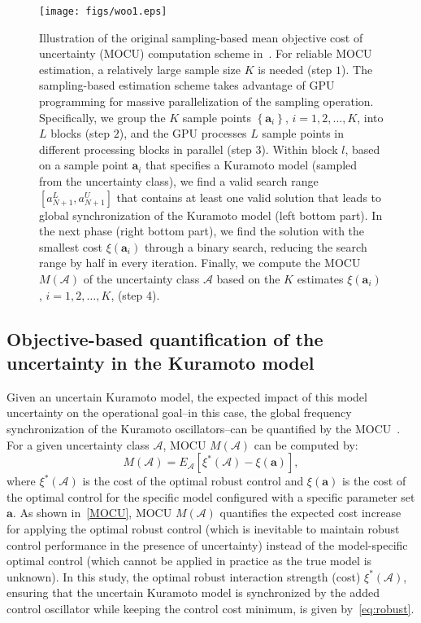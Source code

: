 \documentclass{article}
\begin{document}
\begin{figure*}[!t]
\centering
\texttt{[image: figs/woo1.eps]}
\caption{Illustration of the original sampling-based mean objective cost of uncertainty (MOCU) computation scheme in~\cite{Hong2021}. For reliable MOCU estimation, a relatively large sample size $K$ is needed (step $1$). The sampling-based estimation scheme takes advantage of GPU programming for massive parallelization of the sampling operation. Specifically, we group the $K$ sample points ${\left\{\mathbf{a}_i\right\}}$, ${i = 1, 2, \dots, K}$, into $L$ blocks (step $2$), and the GPU processes $L$ sample points in different processing blocks in parallel (step $3$). Within block ${l}$, based on a sample point ${\mathbf{a}_i}$ that specifies a Kuramoto model (sampled from the uncertainty class), we find a valid search range ${\left[a^L_{N+1}, a^U_{N+1} \right]}$ that contains at least one valid solution that leads to global synchronization of the Kuramoto model (left bottom part). In the next phase (right bottom part), we find the solution with the smallest cost ${\xi\left(\mathbf{a}_i\right)}$ through a binary search, reducing the search range by half in every iteration. Finally, we compute the MOCU ${M\left(\mathbf{\mathcal{A}}\right)}$ of the uncertainty class ${\mathbf{\mathcal{A}}}$ based on the $K$ estimates ${\xi\left(\mathbf{a}_i\right)}$, ${i = 1, 2, \dots, K}$, (step 4).}
\label{fig1}
\end{figure*}
\subsection{Objective-based quantification of the uncertainty in the Kuramoto model}
Given an uncertain Kuramoto model, the expected impact of this model uncertainty on the operational goal--in this case, the global frequency synchronization of the Kuramoto oscillators--can be quantified by the MOCU~\cite{Yoon2013tsp}. For a given uncertainty class ${\mathbf{\mathcal{A}}}$, MOCU ${M\left(\mathbf{\mathcal{A}}\right)}$ can be computed by:
\begin{equation}
    M\left(\mathbf{\mathcal{A}}\right) = E_{\mathbf{\mathcal{A}}}\left[ \xi^{\ast} \left(\mathbf{\mathcal{A}}\right) - \xi \left(\mathbf{a}\right) \right],
    \label{MOCU}
\end{equation}
where ${\xi^{\ast} \left(\mathbf{\mathcal{A}}\right)}$ is the cost of the optimal robust control and ${\xi\left(\mathbf{a}\right)}$ is the cost of the optimal control for the specific model configured with a specific parameter set ${\mathbf{a}}$. As shown in~\eqref{MOCU}, MOCU ${M\left(\mathbf{\mathcal{A}}\right)}$ quantifies the expected cost increase for applying the optimal robust control (which is inevitable to maintain robust control performance in the presence of uncertainty) instead of the model-specific optimal control (which cannot be applied in practice as the true model is unknown). In this study, the optimal robust interaction strength (cost) $\xi^{\ast} \left(\mathbf{\mathcal{A}}\right)$, ensuring that the uncertain Kuramoto model is synchronized by the added control oscillator while keeping the control cost minimum, is given by~\eqref{eq:robust}. 
\end{document}
